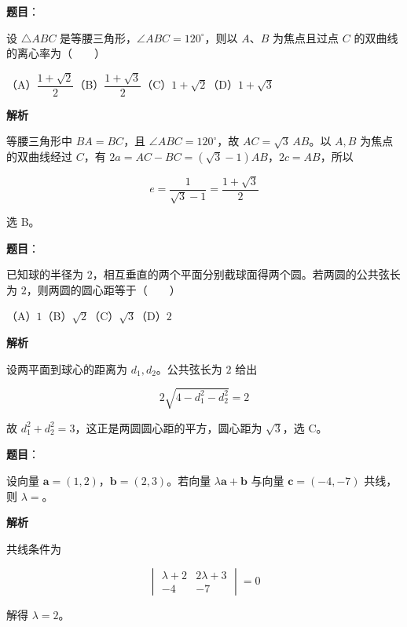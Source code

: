 \begin{answer}

\textbf{题目}：

设 $\triangle ABC$ 是等腰三角形，$\angle ABC=120^\circ$，则以 $A\text{、}B$ 为焦点且过点 $C$ 的双曲线的离心率为\mbox{（　　）}

（A）$\dfrac{1+\sqrt2}{2}$\quad（B）$\dfrac{1+\sqrt3}{2}$\quad（C）$1+\sqrt2$\quad（D）$1+\sqrt3$

\textbf{解析}

等腰三角形中 $BA=BC$，且 $\angle ABC=120^\circ$，故 $AC=\sqrt3\,AB$。以 $A,B$ 为焦点的双曲线经过 $C$，有 $2a=AC-BC=(\sqrt3-1)AB$，$2c=AB$，所以

\nopagebreak[4]
\[
e=\frac1{\sqrt3-1}=\frac{1+\sqrt3}{2}
\]

选 B。


\end{answer}
\begin{answer}

\textbf{题目}：

已知球的半径为 $2$，相互垂直的两个平面分别截球面得两个圆。若两圆的公共弦长为 $2$，则两圆的圆心距等于\mbox{（　　）}

（A）$1$\quad（B）$\sqrt2$\quad（C）$\sqrt3$\quad（D）$2$

\textbf{解析}

设两平面到球心的距离为 $d_1,d_2$。公共弦长为 $2$ 给出

\nopagebreak[4]
\[
2\sqrt{4-d_1^2-d_2^2}=2
\]

故 $d_1^2+d_2^2=3$，这正是两圆圆心距的平方，圆心距为 $\sqrt3$，选 C。


\end{answer}
\begin{answer}

\textbf{题目}：

设向量 $\boldsymbol a=(1,2)$，$\boldsymbol b=(2,3)$。若向量 $\lambda\boldsymbol a+\boldsymbol b$ 与向量 $\boldsymbol c=(-4,-7)$ 共线，则 $\lambda=$\gkblank{}。

\textbf{解析}

共线条件为

\nopagebreak[4]
\[
\begin{vmatrix}\lambda+2&2\lambda+3\\-4&-7\end{vmatrix}=0
\]

解得 $\lambda=2$。


\end{answer}
